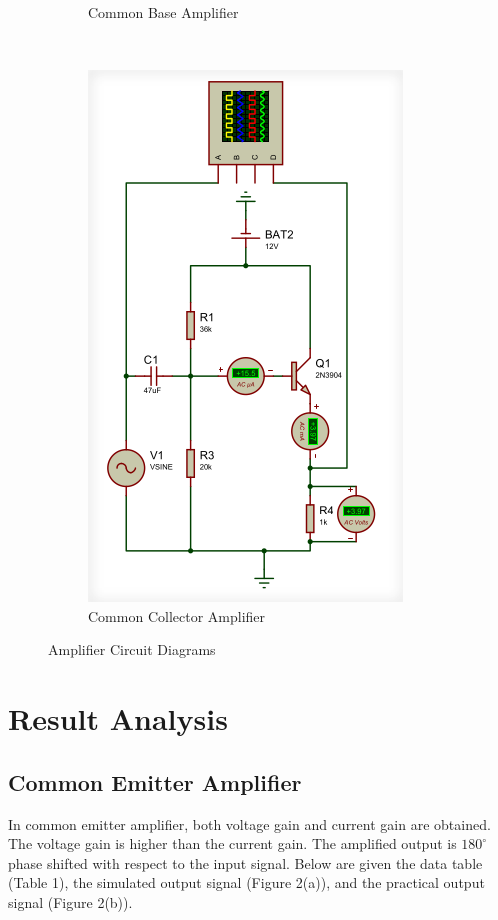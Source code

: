\documentclass[12pt]{article}
\begin{document}
\begin{figure}[h!]
\begin{subfigure}{0.45\textwidth}
        \caption{Common Base Amplifier}
    \end{subfigure} \\
    \begin{subfigure}{0.45\textwidth}
        \centering
        \includegraphics[width=0.6\linewidth]{CC.png}
        \caption{Common Collector Amplifier}
    \end{subfigure}
    \caption{Amplifier Circuit Diagrams}
\end{figure}

\newpage
\section{Result Analysis}
\subsection{Common Emitter Amplifier}
In common emitter amplifier, both voltage gain and current gain are obtained. The voltage gain is higher than the current gain. The amplified output is $180^{\circ}$ phase shifted with respect to the input signal. Below are given the data table (Table 1), the simulated output signal (Figure 2(a)), and the practical output signal (Figure 2(b)).
\end{document}
